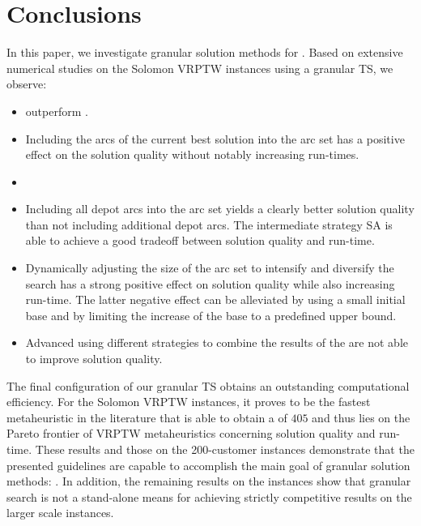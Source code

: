 \documentclass[11pt,a4paper,fleqn]{article}
\begin{document}
\section{Conclusions}
\label{sec:conclusion}
In this paper, we investigate granular solution methods for \problemClass. Based on extensive numerical studies on the Solomon VRPTW instances using a granular TS, we observe: 
\begin{itemize}
\item \reducedcostbasedL \smslong outperform \standardSMS \smslong.
\item Including the arcs of the current best solution into the \reduced arc set has a positive effect on the solution quality without notably increasing run-times.
\item {}
\item Including all depot arcs into the \reduced arc set yields a clearly better solution quality than not including additional depot arcs. The intermediate strategy SA is able to achieve a good tradeoff between solution quality and run-time. 
\item Dynamically adjusting the size of the \reduced arc set to intensify and diversify the search has a strong positive effect on solution quality while also increasing run-time. The latter negative effect can be alleviated by using a small initial base \sfalong and by limiting the increase of the base \sfalong to a predefined upper bound. 
\item Advanced \smslong using different strategies to combine the results of the \standalone \smslong are not able to improve solution quality. 
\end{itemize}

 The final configuration of our granular TS obtains an outstanding computational efficiency. For the Solomon VRPTW instances, it proves to be the fastest metaheuristic in the literature that is able to obtain a \cnv of $405$ and thus lies on the Pareto frontier of VRPTW metaheuristics concerning solution quality and run-time. These results and those on the 200-customer \citeauthor{gehring:99} instances demonstrate that the presented guidelines are capable to accomplish the main goal of granular solution methods: . In addition, the remaining results on the \citeauthor{gehring:99} instances show that granular search is not a stand-alone means for achieving strictly competitive results on the larger scale instances. 
\end{document}
